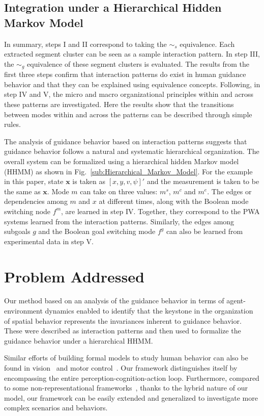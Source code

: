 \documentclass[journal]{IEEEtran}
\begin{document}
\subsection{Integration under a Hierarchical Hidden Markov Model}

In summary, steps I and II correspond to taking the $\sim_s$ equivalence. Each extracted segment cluster can be seen as a sample interaction pattern. In step III, the $\sim_g$ equivalence of these segment clusters is evaluated. The results from the first three steps confirm that interaction patterns do exist in human guidance behavior and that they can be explained using equivalence concepts. Following, in step IV and V, the micro and macro organizational principles within and across these patterns are investigated. Here the results show that the transitions between modes within and across the patterns can be described through simple rules.

The analysis of guidance behavior based on interaction patterns suggests that guidance behavior follows a natural and systematic hierarchical organization. The overall system can be formalized using a hierarchical hidden Markov model (HHMM) as shown in Fig.~\ref{sub:Hierarchical_Markov_Model}. For the example in this paper, state $\mathbf{x}$ is taken as $[x,y,v,\psi]'$ and the measurement is taken to be the same as $\mathbf{x}$. Mode $m$ can take on three values: $m^s$, $m^c$ and $m^e$. The edges or dependencies among $m$ and $x$ at different times, along with the Boolean mode switching node $f^m$, are learned in step IV. Together, they correspond to the PWA systems learned from the interaction patterns.  Similarly, the edges among subgoals $g$ and the Boolean goal switching mode $f^g$ can also be learned from experimental data in step V.  

\section{Problem Addressed}

Our method based on an analysis of the guidance behavior in terms of agent-environment dynamics enabled to identify that the keystone in the organization of spatial behavior represents the invariances inherent to guidance behavior. These were described as interaction patterns and then used to formalize the guidance behavior under a hierarchical HHMM.  

Similar efforts of building formal models to study human behavior can also be found in vision~\cite{mumford2002pattern} and motor control~\cite{wolpert2000computational}. Our framework distinguishes itself by encompassing the entire perception-cognition-action loop. Furthermore, compared to some non-representational frameworks~\cite{lee1998guiding,warren2006dynamics}, thanks to the hybrid nature of our model, our framework can be easily extended and generalized to investigate more complex scenarios and behaviors.
\end{document}
